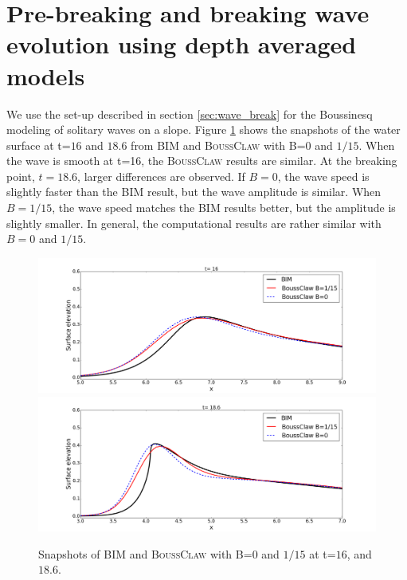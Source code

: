 \documentclass[review]{elsarticle}
\begin{document}
\section{Pre-breaking and breaking wave evolution using depth averaged models}
\label{sec:num_breaking}

We use the set-up described in section \ref{sec:wave_break} for the Boussinesq modeling of
solitary waves on a slope. Figure \ref{fig:bim_boussclaw} shows the snapshots of 
the water surface at t=$16$ and $18.6$
from BIM and \textsc{BoussClaw} with B=$0$ and $1/15$.
When the wave is smooth at t=16, the \textsc{BoussClaw}
results are similar.
At the breaking point, $t=18.6$, larger differences are observed. 
If $B=0$, the wave speed is slightly faster 
than the BIM result, but the wave amplitude is similar. 
When $B=1/15$, the wave speed matches the BIM results better,
but the amplitude is slightly smaller. 
In general, the computational results are rather similar
with $B=0$ and $1/15$. 

\begin{figure}[!htb]
\centering
\includegraphics[width=.9\textwidth]{_fig/bim_boussclaw_160.png}\\
\includegraphics[width=.9\textwidth]{_fig/bim_boussclaw_186.png}
\caption{Snapshots of BIM and \textsc{BoussClaw} with B=$0$ and $1/15$ at t=$16$, and $18.6$.}
\label{fig:bim_boussclaw}
\end{figure}
\end{document}
